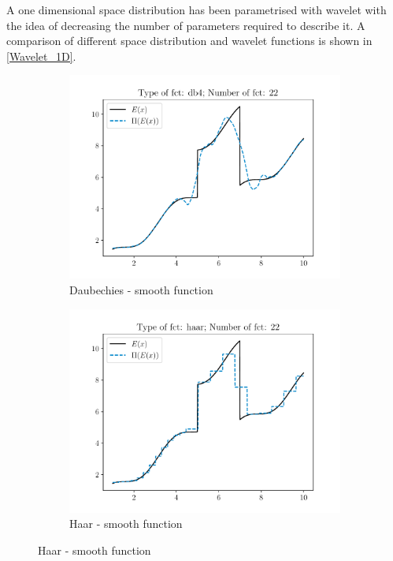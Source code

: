 A one dimensional space distribution has been parametrised with wavelet with the idea of decreasing the number of parameters required to describe it. A comparison of different space distribution and wavelet functions is shown in \cref{Wavelet_1D}.
\begin{figure}[hbpt!]
\begin{subfigure}[t]{0.5\linewidth}
    \centering
    \includegraphics[width=\linewidth]{Figures/db4_N_22.pdf}
    \caption{Daubechies - smooth function}
\end{subfigure}
  \begin{subfigure}[t]{0.5\linewidth}
    \centering
    \includegraphics[width=\linewidth]{Figures/haar_N_22.pdf}
    \caption{Haar - smooth function}

\end{subfigure}
\end{figure}
